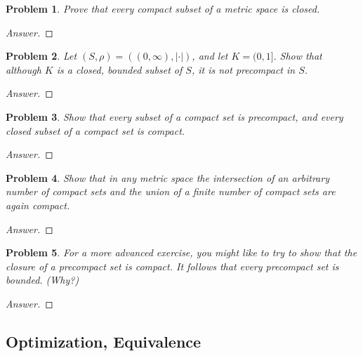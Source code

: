 \documentclass{article}
\newtheorem{problem}{Problem}[section]
\begin{document}
\begin{problem}Prove that every compact subset of a metric space is closed.
\end{problem}

\begin{proof}[Answer]
    
\end{proof}

\begin{problem}Let $(S, \rho)=((0, \infty),|\cdot|)$, and let $K=(0,1] .$ Show that although $K$ is a closed, bounded subset of $S$, it is not precompact in $S$.
\end{problem}

\begin{proof}[Answer]
    
\end{proof}

\begin{problem} Show that every subset of a compact set is precompact, and every closed subset of a compact set is compact.
\end{problem}

\begin{proof}[Answer]
    
\end{proof}

\begin{problem} Show that in any metric space the intersection of an arbitrary number of compact sets and the union of a finite number of compact sets are again compact.
\end{problem}

\begin{proof}[Answer]
    
\end{proof}

\begin{problem} For a more advanced exercise, you might like to try to show that the closure of a precompact set is compact. It follows that every precompact set is bounded. (Why?)
\end{problem}

\begin{proof}[Answer]
    
\end{proof}

\subsection{Optimization, Equivalence}
\end{document}
